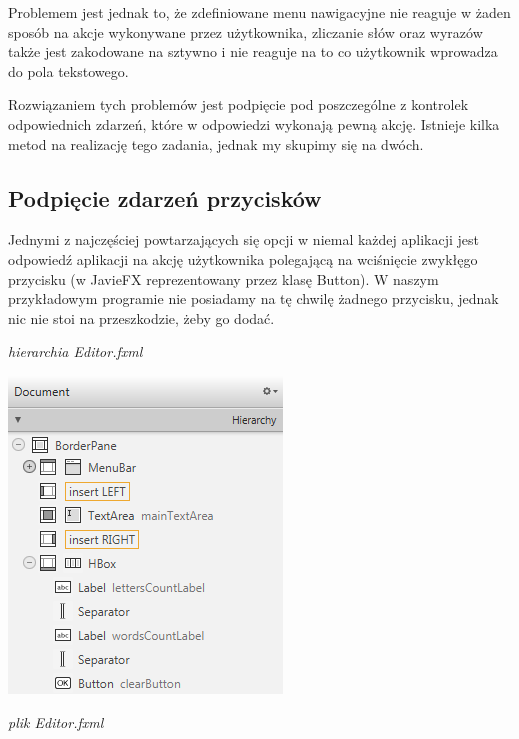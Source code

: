 \documentclass[letterpaper,10pt,english]{sphinxmanual}
\begin{document}
Problemem jest jednak to, że zdefiniowane menu nawigacyjne nie reaguje w żaden sposób na akcje wykonywane przez użytkownika, zliczanie słów oraz wyrazów także jest zakodowane na sztywno i nie reaguje na to co użytkownik wprowadza do pola tekstowego.

Rozwiązaniem tych problemów jest podpięcie pod poszczególne z kontrolek odpowiednich zdarzeń, które w odpowiedzi wykonają pewną akcję. Istnieje kilka metod na realizację tego zadania, jednak my skupimy się na dwóch.


\subsection{Podpięcie zdarzeń przycisków}
\label{gui2:podpiecie-zdarzen-przyciskow}
Jednymi z najczęściej powtarzających się opcji w niemal każdej aplikacji jest odpowiedź aplikacji na akcję użytkownika polegającą na wciśnięcie zwykłęgo przycisku (w JavieFX reprezentowany przez klasę Button). W naszym przykładowym programie nie posiadamy na tę chwilę żadnego przycisku, jednak nic nie stoi na przeszkodzie, żeby go dodać.

\emph{hierarchia Editor.fxml}

{\hfill\includegraphics{button-hierarchy.png}\hfill}

\emph{plik Editor.fxml}
\end{document}
